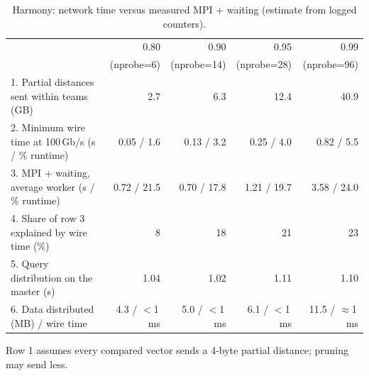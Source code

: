 \begin{table}[t]
\centering
\caption{Harmony: network time versus measured MPI + waiting (estimate from logged counters).}
\label{tab:rdma-harmony}
\footnotesize
\begin{tabular}{lrrrr}
\toprule
 & 0.80 & 0.90 & 0.95 & 0.99 \\
 & (nprobe=6) & (nprobe=14) & (nprobe=28) & (nprobe=96) \\
\midrule
1. Partial distances sent within teams (GB)        & 2.7 & 6.3 & 12.4 & 40.9 \\
2. Minimum wire time at 100\,Gb/s (s / \% runtime) & 0.05 / 1.6 & 0.13 / 3.2 & 0.25 / 4.0 & 0.82 / 5.5 \\
3. MPI + waiting, average worker (s / \% runtime)  & 0.72 / 21.5 & 0.70 / 17.8 & 1.21 / 19.7 & 3.58 / 24.0 \\
4. Share of row 3 explained by wire time (\%)      & 8 & 18 & 21 & 23 \\
5. Query distribution on the master (s)            & 1.04 & 1.02 & 1.11 & 1.10 \\
6. Data distributed (MB) / wire time               & 4.3 / $<$1\,ms & 5.0 / $<$1\,ms & 6.1 / $<$1\,ms & 11.5 / $\approx$1\,ms \\
\bottomrule
\end{tabular}

\vspace{2pt}
{\footnotesize Row 1 assumes every compared vector sends a 4-byte partial distance; pruning may send less.}
\end{table}
